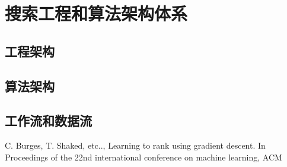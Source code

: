 
\chapter{搜索工程和算法架构体系} 
\thispagestyle{empty}

\setlength{\fboxrule}{0pt}\setlength{\fboxsep}{0cm}
\noindent\shadowbox{
\begin{tcolorbox}[arc=0mm,colback=lightblue,colframe=darkblue,title=学习目标与要求]

\end{tcolorbox}}
\setlength{\fboxrule}{1pt}\setlength{\fboxsep}{4pt} 

\section{工程架构} 

\section{算法架构} 

\section{工作流和数据流} 


\begin{thebibliography}{99}
 C. Burges, T. Shaked, etc.., Learning to rank 
using gradient descent. In Proceedings of the 22nd international 
conference on machine learning, ACM
\end{thebibliography}

 
